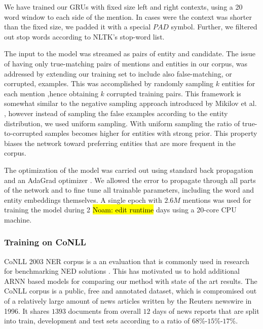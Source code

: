 \documentclass[11pt]{article}
\begin{document}
	We have trained our GRUs with fixed size left and right contexts, using a 20 word window to each side of the mention. In cases were the context was shorter than the fixed size, we padded it with a special $PAD$ symbol. Further, we filtered out stop words according to NLTK's stop-word list.
	
	The input to the model was streamed as pairs of entity and candidate. The issue of having only true-matching pairs of mentions and entities in our corpus, was addressed by extending our training set to include also false-matching, or corrupted, examples. This was accomplished by randomly sampling $k$ entities for each mention ,hence obtaining $k$ corrupted training pairs. This framework is somewhat similar to the negative sampling approach introduced by Mikilov et al.    \cite{mikolov2013distributed}, however instead of sampling the false examples according to the entity distribution, we used uniform sampling. With uniform sampling the ratio of true-to-corrupted samples becomes higher for entities with strong prior. This property biases the network toward preferring entities that are more frequent in the corpus.
	
	The optimization of the model was carried out using standard back propagation and an AdaGrad optimizer \cite{duchi2011adaptive}. We allowed the error to propagate through all parts of the network and to fine tune all trainable parameters, including the word and entity embeddings themselves. A single epoch with $2.6M$ mentions was used for training the model during 2 \hl{Noam: edit runtime} days using a 20-core CPU machine.

    \subsubsection{Training on CoNLL}
    CoNLL 2003 NER corpus is a an evaluation that is commonly used in research for benchmarking NED solutions \cite{Globerson2016,Hachey2013,Yamada2016,Pershina2015}. This has motivated us to hold additional ARNN based models for comparing our method with state of the art results.
    The CoNLL corpus is a public, free and annotated dataset, which is compromised out of a relatively large amount of news articles written  by the Reuters newswire in 1996. It shares $1393$ documents from overall $12$ days of news reports that are split into train, development and test sets according to a ratio of $68$\%-$15$\%-$17$\%. 
	
\end{document}
